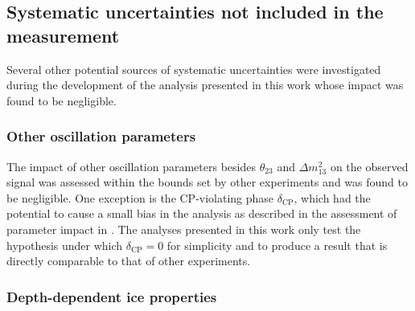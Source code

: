 \subsection{Systematic uncertainties not included in the measurement}
\label{sec:other-uncertainties}

Several other potential sources of systematic uncertainties were investigated during the development of the analysis presented in this work whose impact was found to be negligible. 

\subsubsection{Other oscillation parameters}
\label{sec:other-oscillation-syst}

The impact of other oscillation parameters besides $\theta_{23}$ and $\Delta m^2_{13}$ on the observed signal was assessed within the bounds set by other experiments and was found to be negligible. One exception is the CP-violating phase $\delta_{\mathrm{CP}}$, which had the potential to cause a small bias in the analysis as described in the assessment of parameter impact in . The analyses presented in this work only test the hypothesis under which $\delta_{\mathrm{CP}}=0$ for simplicity and to produce a result that is directly comparable to that of other experiments.

\subsubsection{Depth-dependent ice properties}
\label{sec:depth-dependent-ice-properties}


